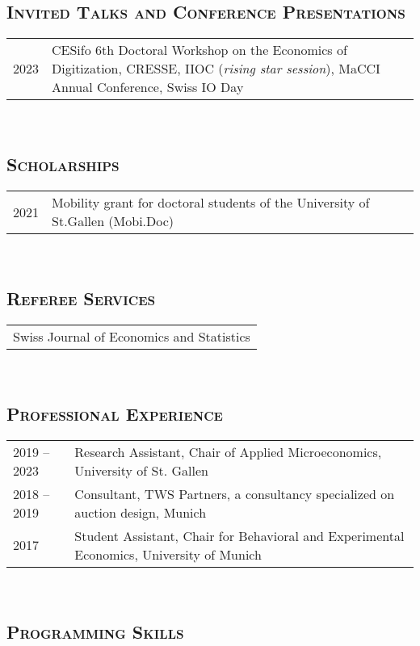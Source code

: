 \documentclass[12pt]{article}
\begin{document}
\vspace{-0.45cm}\subsection*{\textsc{Invited Talks and Conference Presentations}}
\begin{tabular}{p{}p{}}
	2023 & CESifo 6th Doctoral Workshop on the Economics of Digitization, CRESSE, IIOC (\textit{rising star session}), MaCCI Annual Conference, Swiss IO Day  \end{tabular} \\
\vspace{-0.45cm}\subsection*{\textsc{Scholarships}}
\begin{tabular}{p{}p{}}
	2021 & Mobility grant for doctoral students of the University of St.Gallen (Mobi.Doc)
\end{tabular}\\
\vspace{-0.45cm}\subsection*{\textsc{Referee Services}}
\begin{tabular}{l}
	Swiss Journal of Economics and Statistics
\end{tabular}\\
\vspace{-0.45cm}\subsection*{\textsc{Professional Experience}}
\begin{tabular}{p{}p{}}
	2019 -- 2023 & Research Assistant, Chair of Applied Microeconomics, University of St. Gallen\\
	2018 -- 2019 & Consultant, TWS Partners, a consultancy specialized on auction design, Munich \\
	2017 & Student Assistant,  Chair for Behavioral and Experimental Economics, University of Munich \end{tabular} \\
\vspace{-0.45cm}\subsection*{\textsc{Programming Skills}}
\end{document}
